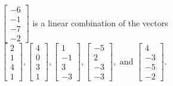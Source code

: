 \begin{exercise}
\begin{exerciseStatement}
  \end{exerciseStatement}
  \begin{exerciseAnswer}
   \(\left[\begin{array}{c}
-6 \\
-1 \\
-7 \\
-2
\end{array}\right]\) 
  	 is  
	a linear combination of the vectors \(\left[\begin{array}{c}
2 \\
1 \\
4 \\
1
\end{array}\right] , \left[\begin{array}{c}
4 \\
0 \\
3 \\
1
\end{array}\right] , \left[\begin{array}{c}
1 \\
-1 \\
3 \\
-3
\end{array}\right] , \left[\begin{array}{c}
-5 \\
2 \\
-3 \\
-3
\end{array}\right] , \text{ and } \left[\begin{array}{c}
4 \\
-3 \\
-5 \\
-2
\end{array}\right]\).

	
  


  \end{exerciseAnswer}
\end{exercise}